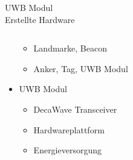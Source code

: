 \documentclass{beamer}
\begin{document}
\begin{frame}{UWB Modul\\\normalsize{Erstellte Hardware}}
\begin{columns}
\begin{column}{0.5\linewidth}
\begin{itemize}
\begin{itemize}
					\item Landmarke, Beacon
					\item Anker, Tag, UWB Modul
				\end{itemize}
				\item<3-> UWB Modul
				\begin{itemize}
					\item DecaWave Transceiver
					\item Hardwareplattform
					\item Energieversorgung
				\end{itemize}
			\end{itemize}
		\end{column}
	\end{columns}
\end{frame}


%
%
\end{document}
